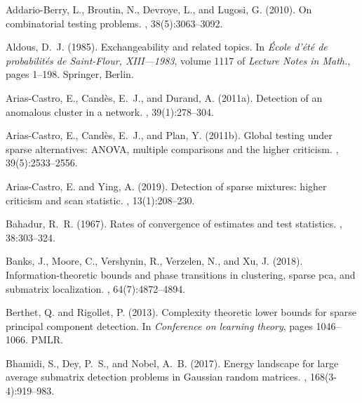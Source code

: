 \documentclass[11pt,reqno,letterpaper]{amsart}
\numberwithin{equation}{section}
\theoremstyle{plain}
\begin{document}

\begin{thebibliography}{}
	
	Addario-Berry, L., Broutin, N., Devroye, L., and Lugosi, G. (2010).
	\newblock On combinatorial testing problems.
	, 38(5):3063--3092.
	
	Aldous, D.~J. (1985).
	\newblock Exchangeability and related topics.
	\newblock In {\em \'{E}cole d'\'{e}t\'{e} de probabilit\'{e}s de
		{S}aint-{F}lour, {XIII}---1983}, volume 1117 of {\em Lecture Notes in Math.},
	pages 1--198. Springer, Berlin.
	
	Arias-Castro, E., Cand\`es, E.~J., and Durand, A. (2011a).
	\newblock Detection of an anomalous cluster in a network.
	, 39(1):278--304.
	
	Arias-Castro, E., Cand\`es, E.~J., and Plan, Y. (2011b).
	\newblock Global testing under sparse alternatives: {ANOVA}, multiple
	comparisons and the higher criticism.
	, 39(5):2533--2556.
	
	Arias-Castro, E. and Ying, A. (2019).
	\newblock Detection of sparse mixtures: higher criticism and scan statistic.
	, 13(1):208--230.
	
	Bahadur, R.~R. (1967).
	\newblock Rates of convergence of estimates and test statistics.
	, 38:303--324.
	
	Banks, J., Moore, C., Vershynin, R., Verzelen, N., and Xu, J. (2018).
	\newblock Information-theoretic bounds and phase transitions in clustering,
	sparse pca, and submatrix localization.
	, 64(7):4872--4894.
	
	Berthet, Q. and Rigollet, P. (2013).
	\newblock Complexity theoretic lower bounds for sparse principal component
	detection.
	\newblock In {\em Conference on learning theory}, pages 1046--1066. PMLR.
	
	Bhamidi, S., Dey, P.~S., and Nobel, A.~B. (2017).
	\newblock Energy landscape for large average submatrix detection problems in
	{G}aussian random matrices.
	, 168(3-4):919--983.
	

\end{thebibliography}
\end{document}

